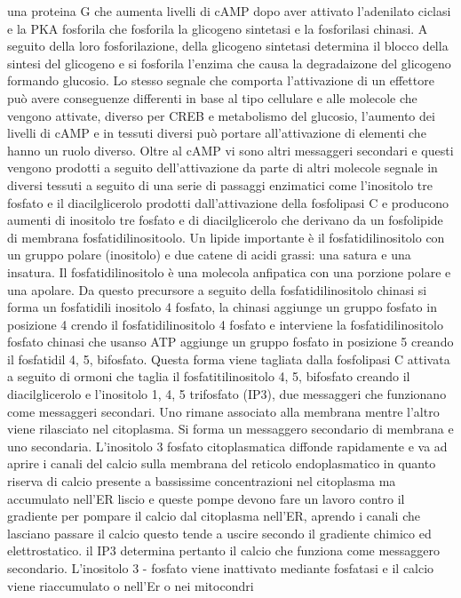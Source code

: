 una proteina G che aumenta livelli di cAMP dopo aver attivato l'adenilato ciclasi e la PKA fosforila che fosforila la glicogeno sintetasi e la fosforilasi chinasi. A seguito della loro 
fosforilazione, della glicogeno sintetasi determina il blocco della sintesi del glicogeno e si fosforila l'enzima che causa la degradaizone del glicogeno formando glucosio. Lo stesso
segnale che comporta l'attivazione di un effettore pu\`o avere conseguenze differenti in base al tipo cellulare e alle molecole che vengono attivate, diverso per CREB e metabolismo del
glucosio, l'aumento dei livelli di cAMP e in tessuti diversi pu\`o portare all'attivazione di elementi che hanno un ruolo diverso. Oltre al cAMP vi sono altri messaggeri secondari e 
questi vengono prodotti a seguito dell'attivazione da parte di altri molecole segnale in diversi tessuti a seguito di una serie di passaggi enzimatici come l'inositolo tre fosfato e il 
diacilglicerolo prodotti dall'attivazione della fosfolipasi C e producono aumenti di inositolo tre fosfato e di diacilglicerolo che derivano da un fosfolipide di membrana 
fosfatidilinositoolo. Un lipide importante \`e il fosfatidilinositolo con un gruppo polare (inositolo) e due catene di acidi grassi: una satura e una insatura. Il fosfatidilinositolo \`e
una molecola anfipatica con una porzione polare e una apolare. Da questo precursore a seguito della fosfatidilinositolo chinasi si forma un fosfatidili inositolo 4 fosfato, la chinasi 
aggiunge un gruppo fosfato in posizione 4 crendo il fosfatidilinositolo 4 fosfato e interviene la fosfatidilinositolo fosfato chinasi che usanso ATP aggiunge un gruppo fosfato in
posizione 5 creando il fosfatidil 4, 5, bifosfato. Questa forma viene tagliata dalla fosfolipasi C attivata a seguito di ormoni che taglia il fosfatitilinositolo 4, 5, bifosfato creando
il diacilglicerolo e l'inositolo 1, 4, 5 trifosfato (IP3), due messaggeri che funzionano come messaggeri secondari. Uno rimane associato alla membrana mentre l'altro viene rilasciato nel
citoplasma. Si forma un messaggero secondario di membrana e uno secondaria. L'inositolo 3 fosfato citoplasmatica diffonde rapidamente e va ad aprire i canali del calcio sulla membrana 
del reticolo endoplasmatico in quanto riserva di calcio presente a bassissime concentrazioni nel citoplasma ma accumulato nell'ER liscio e queste pompe devono fare un lavoro contro il 
gradiente per pompare il calcio dal citoplasma nell'ER, aprendo i canali che lasciano passare il calcio questo tende a uscire secondo il gradiente chimico ed elettrostatico. il IP3 
determina pertanto il calcio che funziona come messaggero secondario. L'inositolo 3 - fosfato viene inattivato mediante fosfatasi e il calcio viene riaccumulato o nell'Er o nei mitocondri
